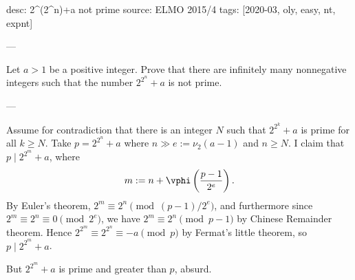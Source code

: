 desc: 2^(2^n)+a not prime
source: ELMO 2015/4
tags: [2020-03, oly, easy, nt, expnt]

---

Let $a>1$ be a positive integer. Prove that there are infinitely many nonnegative integers such that the number $2^{2^n}+a$ is not prime.

---

Assume for contradiction that there is an integer $N$ such that $2^{2^k}+a$ is prime for all $k\ge N$. Take $p=2^{2^n}+a$ where $n\gg e:=\nu_2(a-1)$ and $n\ge N$. I claim that $p\mid2^{2^m}+a$, where \[m:=n+\vphi\left(\frac{p-1}{2^e}\right).\]
By Euler's theorem, $2^m\equiv2^n\pmod{(p-1)/2^e}$, and furthermore since $2^m\equiv2^n\equiv0\pmod{2^e}$, we have $2^m\equiv2^n\pmod{p-1}$ by Chinese Remainder theorem. Hence $2^{2^m}\equiv2^{2^n}\equiv-a\pmod p$ by Fermat's little theorem, so $p\mid2^{2^m}+a$.

But $2^{2^m}+a$ is prime and greater than $p$, absurd.
